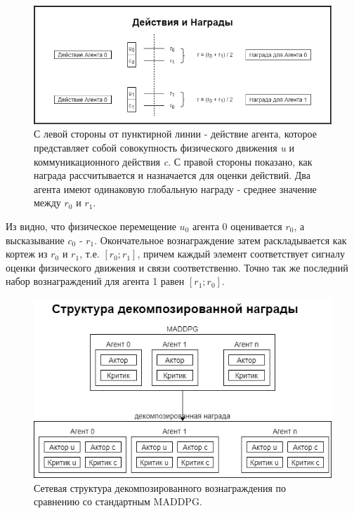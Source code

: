\begin{figure}[ht!]
    \center
    \includegraphics [scale=0.60] {my_folder/images/ch4/actions_and_rewards.png}
    \caption{С левой стороны от пунктирной линии - действие агента, которое представляет собой совокупность физического движения \textit{u} и коммуникационного действия \textit{c}. С правой стороны показано, как награда рассчитывается и назначается для оценки действий. Два агента имеют одинаковую глобальную награду - среднее значение между $r_0$ и $r_1$.}
    \label{fig:action-reward}
\end{figure}

Из  видно, что физическое перемещение $u_0$ агента 0 оценивается $r_0$, а высказывание $c_0$ - $r_1$. Окончательное вознаграждение затем раскладывается как кортеж из $r_0$ и $r_1$, т.е. $[r_0; r_1]$, причем каждый элемент соответствует сигналу оценки физического движения и связи соответственно. Точно так же последний набор вознаграждений для агента 1 равен $[r_1; r_0]$.

\begin{figure}[ht!]
    \center
    \includegraphics [scale=0.60] {my_folder/images/ch4/decomposed_reward_structure.png}
    \caption{Сетевая структура декомпозированного вознаграждения по сравнению со стандартным MADDPG.}
    \label{fig:decomposed-reward-structure}
\end{figure}

